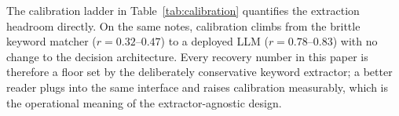 \documentclass[conference]{IEEEtran}
\begin{document}
The calibration ladder in Table~\ref{tab:calibration} quantifies the extraction
headroom directly. On the same notes, calibration climbs from the brittle keyword
matcher ($r{=}0.32$--$0.47$) to a deployed LLM ($r{=}0.78$--$0.83$) with no change
to the decision architecture. Every recovery number in this paper is therefore a
floor set by the deliberately conservative keyword extractor; a better reader
plugs into the same interface and raises calibration measurably, which is the
operational meaning of the extractor-agnostic design.



\end{document}

